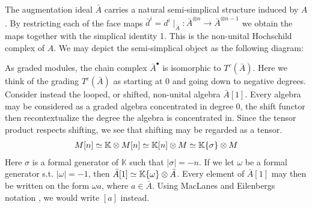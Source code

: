 \documentclass[../thesis.tex]{subfiles}
\begin{document}
            The augmentation ideal $\bar{A}$ carries a natural semi-simplical structure induced by $A$. By restricting each of the face maps ${\bar{d}}^i = d^i {\mid}_{\bar{A}}:\bar{A}^{\otimes n} \rightarrow \bar{A}^{\otimes n-1}$ we obtain the maps together with the simplical identity 1. This is the non-unital Hochschild complex of $A$. We may depict the semi-simplical object as the following diagram:
            \begin{center}
            \end{center}

            As graded modules, the chain complex $\bar{A}^\bullet$ is isomorphic to $T^c(\bar{A})$. Here we think of the grading $T^c(\bar{A})$ as starting at $0$ and going down to negative degrees. Consider instead the looped, or shifted, non-unital algebra $\bar{A}[1]$. Every algebra may be considered as a graded algebra concentrated in degree $0$, the shift functor then recontextualize the degree the algebra is concentrated in. Since the tensor product respects shifting, we see that shifting may be regarded as a tensor.
            \begin{align*}
                M[n] \simeq \mathbb{K} \otimes M[n] \simeq \mathbb{K}[n] \otimes M \simeq \mathbb{K}\{\sigma\} \otimes M
            \end{align*}
            Here $\sigma$ is a formal generator of $\mathbb{K}$ such that $|\sigma| = -n$. If we let $\omega$ be a formal generator s.t. $|\omega| = -1$, then $\bar{A}[1] \simeq \mathbb{K}\{\omega\} \otimes \bar{A}$. Every element of $\bar{A}[1]$ may then be written on the form $\omega a$, where $a \in \bar{A}$. Using MacLanes and Eilenbergs notation \cite{Eilenberg53}, we would write $[a]$ instead.
\end{document}
